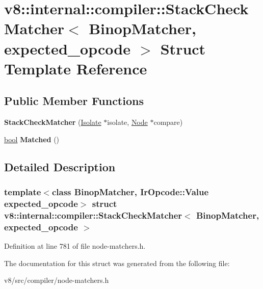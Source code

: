 \hypertarget{structv8_1_1internal_1_1compiler_1_1StackCheckMatcher}{}\section{v8\+:\+:internal\+:\+:compiler\+:\+:Stack\+Check\+Matcher$<$ Binop\+Matcher, expected\+\_\+opcode $>$ Struct Template Reference}
\label{structv8_1_1internal_1_1compiler_1_1StackCheckMatcher}
\subsection*{Public Member Functions}
\begin{DoxyCompactItemize}
\item 
\mbox{\label{structv8_1_1internal_1_1compiler_1_1StackCheckMatcher_aeac75351e6b028c2f194d132e1e050f6}} 
{\bfseries Stack\+Check\+Matcher} (\mbox{\hyperlink{classv8_1_1internal_1_1Isolate}{Isolate}} $\ast$isolate, \mbox{\hyperlink{classv8_1_1internal_1_1compiler_1_1Node}{Node}} $\ast$compare)
\item 
\mbox{\label{structv8_1_1internal_1_1compiler_1_1StackCheckMatcher_a9801f90a68031199c73ca5da9bb3531e}} 
\mbox{\hyperlink{classbool}{bool}} {\bfseries Matched} ()
\end{DoxyCompactItemize}


\subsection{Detailed Description}
\subsubsection*{template$<$class Binop\+Matcher, Ir\+Opcode\+::\+Value expected\+\_\+opcode$>$\newline
struct v8\+::internal\+::compiler\+::\+Stack\+Check\+Matcher$<$ Binop\+Matcher, expected\+\_\+opcode $>$}



Definition at line 781 of file node-\/matchers.\+h.



The documentation for this struct was generated from the following file\+:\begin{DoxyCompactItemize}
\item 
v8/src/compiler/node-\/matchers.\+h\end{DoxyCompactItemize}

